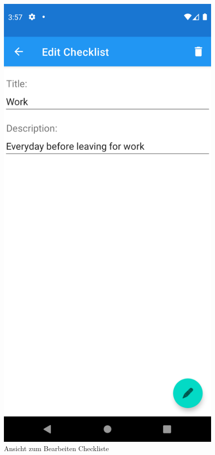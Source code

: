 \\
\begin{figure}[h]
	\centering
	\begin{minipage}{0.45\linewidth}
		\centering
		\includegraphics[width=.9\linewidth]{Bilder/EditChecklist.png}
		\caption{Ansicht zum Bearbeiten Checkliste}
		\label{fig:editView}
	\end{minipage}

\end{figure}
